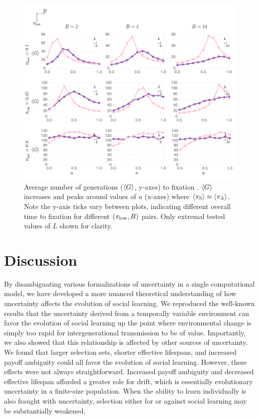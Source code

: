 \documentclass[letterpaper,11.5pt]{scrartcl}
\begin{document}
\begin{figure}
  \caption{Average number of generations ($\langle G \rangle$, y-axes) to fixation . 
    $\langle G \rangle$ increases and peaks around values of $u$ (x-axes) where
  $\langle \pi_\mathrm{S} \rangle \approx \langle \pi_\mathrm{A} \rangle$. Note the y-axis ticks vary between plots,
indicating different overall time to fixation for different $(\pi_{\mathrm{low}}, B)$
pairs. Only extremal tested values of $L$ shown for clarity.} 
  \label{fig:steps}
\centering
    \includegraphics[width=\textwidth]{Figures/stepResultsPlots.pdf}
\end{figure}


\section{Discussion}

By disambiguating various formalizations of uncertainty in a single computational model, we have developed a more nuanced theoretical understanding of how uncertainty affects the evolution of social learning.
We reproduced the well-known results that the uncertainty derived from a temporally variable environment can favor the evolution of social learning up the point where environmental change is simply too rapid for intergenerational transmission to be of value. Importantly, we also showed that this relationship is affected by other sources of uncertainty. 
We found that larger selection sets, shorter effective lifespans, and increased payoff ambiguity could all favor the evolution of social learning. However, these effects were not always straightforward. 
Increased payoff ambiguity and decreased effective lifespan afforded a greater role for drift, which is essentially
evolutionary uncertainty in a finite-size population. When the ability to learn individually is also fraught with uncertainty, selection either for or against social learning may be substantially weakened. 
\end{document}
